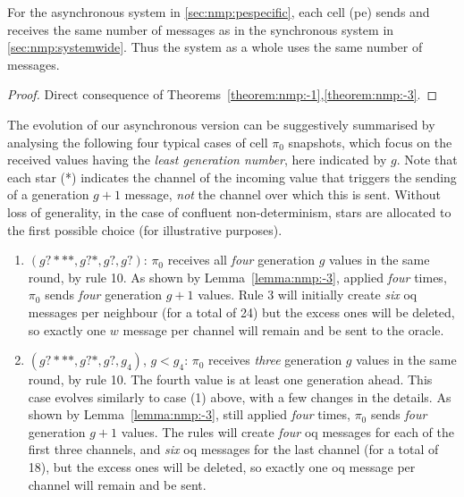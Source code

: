 \begin{theorem}\label{theorem:nmp:-4}
    For the asynchronous system in \autoref{sec:nmp:pespecific}, 
    each cell (\gls{pe}) sends and receives the same number of messages as in the synchronous system in \autoref{sec:nmp:systemwide}.   
    Thus the system as a whole uses the same number of messages.
\end{theorem}

\begin{proof}
    Direct consequence of Theorems~\ref{theorem:nmp:-1},\ref{theorem:nmp:-3}. %
\end{proof}

\begin{remark}\label{remark:nmp:-2}
    The evolution of our asynchronous version can be suggestively summarised by
    analysing the following four typical cases of cell $\pi_0$ snapshots,
    which focus on the received values having the \emph{least generation number}, here indicated by $g$.
    Note that each star (*) indicates the channel of the incoming value 
    that triggers the sending of a generation $g+1$ message, 
    \emph{not} the channel over which this is sent.
    Without loss of generality, in the case of confluent non-determinism,
    stars are allocated to the first possible choice (for illustrative purposes).
    
    \begin{enumerate}
    \item $(g?***, g?*, g?, g?)$: 
    $\pi_0$ receives all \emph{four} generation $g$ values in the same round, by rule 10. 
    As shown by Lemma~\ref{lemma:nmp:-3}, applied \emph{four} times, 
    $\pi_0$ sends \emph{four} generation $g+1$ values.
    Rule 3 will initially create \emph{six} \gls{oq} messages per neighbour (for a total of 24)
    but the excess ones will be deleted, so exactly one \(w\) message per channel will remain and be sent to the oracle.
    
    \medskip
    \item $(g?***, g?*, g?, g_4)$, $g < g_4$: 
    $\pi_0$ receives \emph{three} generation $g$ values in the same round, by rule 10.
    The fourth value is at least one generation ahead.    
    This case evolves similarly to case (1) above, with a few changes in the details.
    As shown by Lemma~\ref{lemma:nmp:-3}, still applied \emph{four} times, 
    $\pi_0$ sends \emph{four} generation $g+1$ values.
    The rules will create \emph{four} \gls{oq} messages for each of the first three channels,
    and \emph{six} \gls{oq} messages for the last channel (for a total of 18),
    but the excess ones will be deleted, so exactly one \gls{oq} message per channel will remain and be sent.
    

\end{enumerate}
\end{remark}
